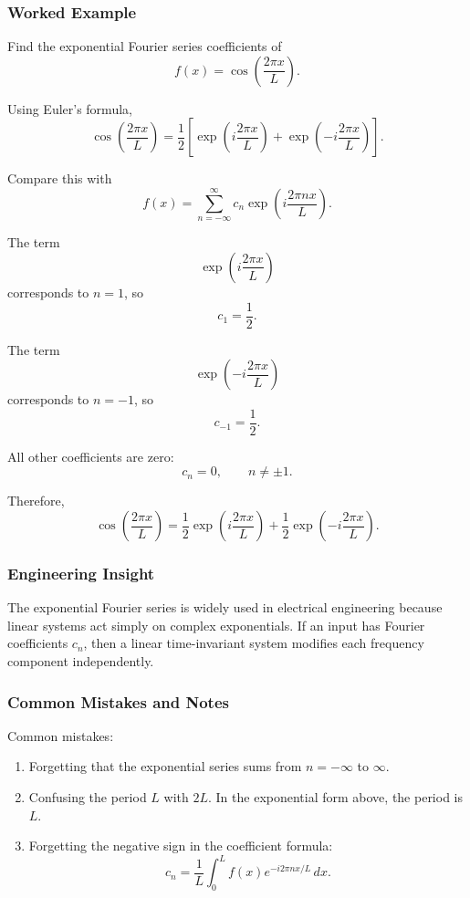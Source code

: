 \subsubsection*{Worked Example}

\begin{examplebox}
    Find the exponential Fourier series coefficients of
    \[
        f(x)=\cos\left(\frac{2\pi x}{L}\right).
    \]

    Using Euler's formula,
    \[
        \cos\left(\frac{2\pi x}{L}\right)
        =
        \frac{1}{2}
        \left[
            \exp\left(i\frac{2\pi x}{L}\right)
            +
            \exp\left(-i\frac{2\pi x}{L}\right)
            \right].
    \]

    Compare this with
    \[
        f(x)=\sum_{n=-\infty}^{\infty}
        c_n\exp\left(i\frac{2\pi n x}{L}\right).
    \]

    The term
    \[
        \exp\left(i\frac{2\pi x}{L}\right)
    \]
    corresponds to $n=1$, so
    \[
        c_1=\frac{1}{2}.
    \]

    The term
    \[
        \exp\left(-i\frac{2\pi x}{L}\right)
    \]
    corresponds to $n=-1$, so
    \[
        c_{-1}=\frac{1}{2}.
    \]

    All other coefficients are zero:
    \[
        c_n=0,\qquad n\neq \pm 1.
    \]

    Therefore,
    \[
        \cos\left(\frac{2\pi x}{L}\right)
        =
        \frac{1}{2}\exp\left(i\frac{2\pi x}{L}\right)
        +
        \frac{1}{2}\exp\left(-i\frac{2\pi x}{L}\right).
    \]
\end{examplebox}

\subsubsection*{Engineering Insight}

\begin{noteBox}
    The exponential Fourier series is widely used in electrical engineering because linear systems act simply on complex exponentials. If an input has Fourier coefficients $c_n$, then a linear time-invariant system modifies each frequency component independently.
\end{noteBox}

\subsubsection*{Common Mistakes and Notes}

\begin{conceptbox}
    Common mistakes:
    \begin{enumerate}
        \item Forgetting that the exponential series sums from $n=-\infty$ to $\infty$.
        \item Confusing the period $L$ with $2L$. In the exponential form above, the period is $L$.
        \item Forgetting the negative sign in the coefficient formula:
              \[
                  c_n=\frac{1}{L}\int_0^L f(x)e^{-i2\pi nx/L}\,dx.
              \]
    \end{enumerate}
\end{conceptbox}